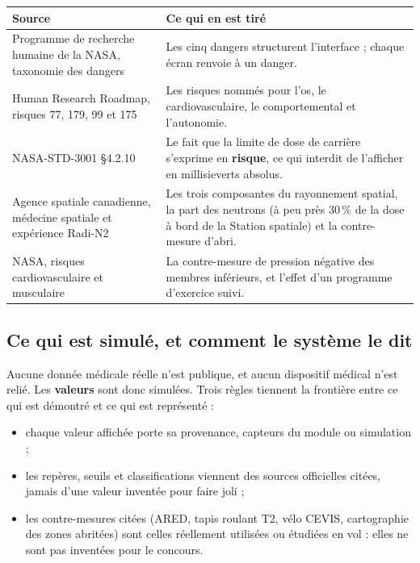 \documentclass[11pt,a4paper]{article}
\begin{document}
\begin{tabularx}{\textwidth}{@{}L{4.6cm} X@{}}
\toprule
\textbf{Source} & \textbf{Ce qui en est tir\'e} \\
\midrule
Programme de recherche humaine de la NASA, taxonomie des dangers & Les cinq dangers structurent l'interface ; chaque \'ecran renvoie \`a un danger. \\
Human Research Roadmap, risques 77, 179, 99 et 175 & Les risques nomm\'es pour l'os, le cardiovasculaire, le comportemental et l'autonomie. \\
NASA-STD-3001 \S4.2.10 & Le fait que la limite de dose de carri\`ere s'exprime en \textbf{risque}, ce qui interdit de l'afficher en millisieverts absolus. \\
Agence spatiale canadienne, m\'edecine spatiale et exp\'erience Radi-N2 & Les trois composantes du rayonnement spatial, la part des neutrons (\`a peu pr\`es 30\,\% de la dose \`a bord de la Station spatiale) et la contre-mesure d'abri. \\
NASA, risques cardiovasculaire et musculaire & La contre-mesure de pression n\'egative des membres inf\'erieurs, et l'effet d'un programme d'exercice suivi. \\
\bottomrule
\end{tabularx}

\subsection{Ce qui est simul\'e, et comment le syst\`eme le dit}

Aucune donn\'ee m\'edicale r\'eelle n'est publique, et aucun dispositif m\'edical n'est reli\'e. Les
\textbf{valeurs} sont donc simul\'ees. Trois r\`egles tiennent la fronti\`ere entre ce qui est
d\'emontr\'e et ce qui est repr\'esent\'e :

\begin{itemize}
  \item chaque valeur affich\'ee porte sa provenance, \og capteurs du module \fg{} ou \og simulation \fg{} ;
  \item les rep\`eres, seuils et classifications viennent des sources officielles cit\'ees, jamais
        d'une valeur invent\'ee pour faire joli ;
  \item les contre-mesures cit\'ees (ARED, tapis roulant T2, v\'elo CEVIS, cartographie des zones
        abrit\'ees) sont celles r\'eellement utilis\'ees ou \'etudi\'ees en vol : elles ne sont pas
        invent\'ees pour le concours.
\end{itemize}
\end{document}
